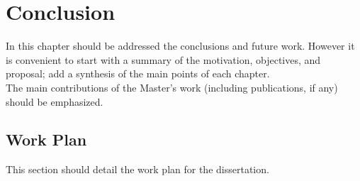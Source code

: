 \chapter{Conclusion}\label{conclusions}

In this chapter should be addressed the conclusions and future work.
However it is convenient to start with a summary of the motivation, objectives, and proposal; 
add a synthesis of the main points of each chapter.\\
The main contributions of the Master's work (including publications, if any) should be emphasized.

\section{Work Plan}

This section should detail the work plan for the dissertation.